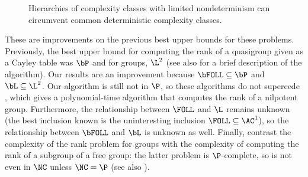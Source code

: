 \begin{figure}
  \caption{\label{fig:inclusions}Hierarchies of complexity classes with limited nondeterminism can circumvent common deterministic complexity classes.}
  \begin{center}
  \end{center}
\end{figure}

These are improvements on the previous best upper bounds for these problems.
Previously, the best upper bound for computing the rank of a quasigroup given as a Cayley table was $\bP$ \autocite[Section~5]{py96} and for groups, $\L^2$ \autocite{lsz77} (see also \cite[Proposition~6]{at06} for a brief description of the algorithm).
Our results are an improvement because $\bFOLL \subseteq \bP$ and $\bL \subseteq \L^2$.
Our algorithm is still not in $\P$, so these algorithms do not supercede \cite[Theorem~7]{at06}, which gives a polynomial-time algorithm that computes the rank of a nilpotent group.
Furthermore, the relationship between $\FOLL$ and $\L$ remains unknown (the best inclusion known is the uninteresting inclusion $\FOLL \subseteq \AC^1$), so the relationship between $\bFOLL$ and $\bL$ is unknown as well.
Finally, contrast the complexity of the rank problem for groups with the complexity of computing the rank of a subgroup of a free group: the latter problem is $\P$-complete, so is not even in $\NC$ unless $\NC = \P$ \autocite[Theorem~4.9]{am84} (see also \autocite[Problem~A.8.11]{ghr95}).

